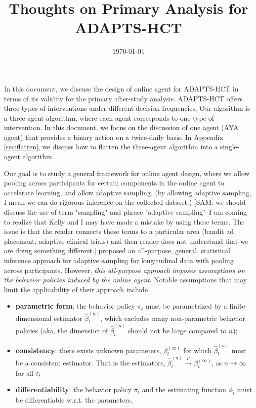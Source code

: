 \documentclass{article}
\title{Thoughts on Primary Analysis for ADAPTS-HCT}
\date{\today}
\newcommand{\sam}[1]{
  {\color{blue} [SAM: {#1}]}
 }
\begin{document}
\maketitle

In this document, we discuss the design of online agent for ADAPTS-HCT in terms of its validity for the primary after-study analysis. ADAPTS-HCT offers three types of interventions under different decision frequencies. Our algorithm is a three-agent algorithm, where each agent corresponds to one type of intervention. In this document, we focus on the discussion of one agent (AYA agent) that provides a binary action on a twice-daily basis. In Appendix \ref{sec:flatten}, we discuss how to flatten the three-agent algorithm into a single-agent algorithm.

Our goal is to study a general framework for online agent design, where we allow pooling across participants for certain components in the online agent to accelerate learning, and allow adaptive sampling. (by allowing adaptive sampling, I mean we can do rigorous inference on the collected dataset.) \sam{we should discuss the use of term "sampling" and phrase "adaptive sampling"--I am coming to realize that Kelly and I may have made a mistake by using these terms.  The issue is that the reader connects these terms to a particular area (bandit ad placement, adaptive clinical trials) and then reader does not understand that we are doing something different.} \cite{zhang2022statistical} proposed an all-purpose, general, statistical inference approach for adaptive sampling for longitudinal data with pooling across participants. However, \textit{this all-purpose  approach imposes assumptions on the behavior policies induced by the online agent}. Notable assumptions that may limit the applicability of their approach include
\begin{itemize}
    \item \textbf{parametric form}: the behavior policy $\pi_t$ must be parametrized by a finite-dimensional estimator $\hat\beta_t^{(n)}$, which excludes many non-parametric behavior policies (aka, the dimension of $\hat\beta_t^{(n)}$ should not be large compared to $n$);
    \item \textbf{consistency}: there exists unknown parameters, $\beta_t^{(\infty)}$ for  which $\hat\beta_t^{(n)}$ must be a consistent estimator.  That is the estimators, $\hat\beta_t^{(n)} \xrightarrow{p} \beta_t^{(\infty)}$, as $n \rightarrow \infty$ for all $t$;
    \item \textbf{differentiability}: the behavior policy $\pi_t$ and the estimating function $\phi_t$ must be differentiable w.r.t. the parameters.
\end{itemize}
\end{document}
